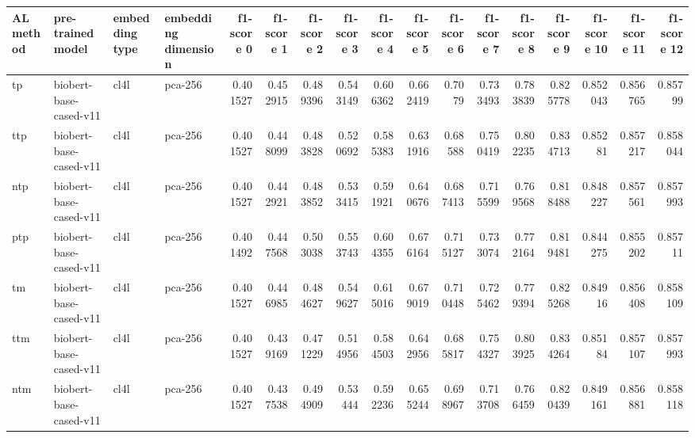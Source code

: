 \begin{tabular}{llllrrrrrrrrrrrrr}
\hline
 AL method   & pre-trained model      & embedding type   & embedding dimension   &   f1-score 0 &   f1-score 1 &   f1-score 2 &   f1-score 3 &   f1-score 4 &   f1-score 5 &   f1-score 6 &   f1-score 7 &   f1-score 8 &   f1-score 9 &   f1-score 10 &   f1-score 11 &   f1-score 12 \\
\hline
 tp          & biobert-base-cased-v11 & cl4l             & pca-256               &     0.401527 &     0.452915 &     0.489396 &     0.543149 &     0.606362 &     0.662419 &     0.7079   &     0.733493 &     0.783839 &     0.825778 &      0.852043 &      0.856765 &      0.85799  \\
 ttp         & biobert-base-cased-v11 & cl4l             & pca-256               &     0.401527 &     0.448099 &     0.483828 &     0.520692 &     0.585383 &     0.631916 &     0.68588  &     0.750419 &     0.802235 &     0.834713 &      0.85281  &      0.857217 &      0.858044 \\
 ntp         & biobert-base-cased-v11 & cl4l             & pca-256               &     0.401527 &     0.442921 &     0.483852 &     0.533415 &     0.591921 &     0.640676 &     0.687413 &     0.715599 &     0.769568 &     0.818488 &      0.848227 &      0.857561 &      0.857993 \\
 ptp         & biobert-base-cased-v11 & cl4l             & pca-256               &     0.401492 &     0.447568 &     0.503038 &     0.553743 &     0.604355 &     0.676164 &     0.715127 &     0.733074 &     0.772164 &     0.819481 &      0.844275 &      0.855202 &      0.85711  \\
 tm          & biobert-base-cased-v11 & cl4l             & pca-256               &     0.401527 &     0.446985 &     0.484627 &     0.549627 &     0.615016 &     0.679019 &     0.710448 &     0.725462 &     0.779394 &     0.825268 &      0.84916  &      0.856408 &      0.858109 \\
 ttm         & biobert-base-cased-v11 & cl4l             & pca-256               &     0.401527 &     0.439169 &     0.471229 &     0.514956 &     0.584503 &     0.642956 &     0.685817 &     0.754327 &     0.803925 &     0.834264 &      0.85184  &      0.857107 &      0.857993 \\
 ntm         & biobert-base-cased-v11 & cl4l             & pca-256               &     0.401527 &     0.437538 &     0.494909 &     0.53444  &     0.592236 &     0.655244 &     0.698967 &     0.713708 &     0.766459 &     0.820439 &      0.849161 &      0.856881 &      0.858118 \\

\end{tabular}
